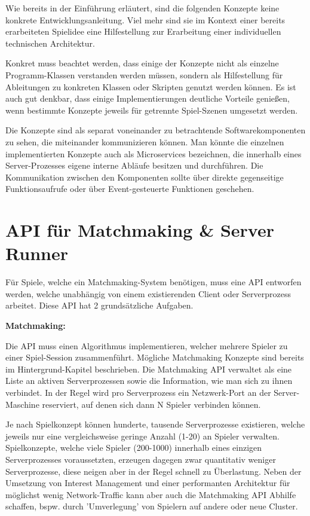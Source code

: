 Wie bereits in der Einführung erläutert, sind die folgenden Konzepte keine konkrete Entwicklungsanleitung. Viel mehr sind sie im Kontext einer bereits erarbeiteten Spielidee eine Hilfestellung zur Erarbeitung einer individuellen technischen Architektur.

Konkret muss beachtet werden, dass einige der Konzepte nicht als einzelne Programm-Klassen verstanden werden müssen, sondern als Hilfestellung für Ableitungen zu konkreten Klassen oder Skripten genutzt werden können. Es ist auch gut denkbar, dass einige Implementierungen deutliche Vorteile genießen, wenn bestimmte Konzepte jeweils für getrennte Spiel-Szenen \cite{Wikipedia.2012} umgesetzt werden.

Die Konzepte sind als separat voneinander zu betrachtende Softwarekomponenten zu sehen, die miteinander kommunizieren können. Man könnte die einzelnen implementierten Konzepte auch als Microservices \cite{Thones.2015} bezeichnen, die innerhalb eines Server-Prozesses eigene interne Abläufe besitzen und durchführen. Die Kommunikation zwischen den Komponenten sollte über direkte gegenseitige Funktionsaufrufe oder über Event-gesteuerte Funktionen \cite{Michelson.2006} geschehen.

\section{API für Matchmaking \& Server Runner}

Für Spiele, welche ein Matchmaking-System benötigen, muss eine API entworfen werden, welche unabhängig von einem existierenden Client oder Serverprozess arbeitet. Diese API hat 2 grundsätzliche Aufgaben. 

\textbf{Matchmaking:}

Die API muss einen Algorithmus implementieren, welcher mehrere Spieler zu einer Spiel-Session zusammenführt. Mögliche Matchmaking Konzepte sind bereits im Hintergrund-Kapitel beschrieben. Die Matchmaking API verwaltet als eine Liste an aktiven Serverprozessen sowie die Information, wie man sich zu ihnen verbindet. In der Regel wird pro Serverprozess ein Netzwerk-Port an der Server-Maschine reserviert, auf denen sich dann N Spieler verbinden können.

Je nach Spielkonzept können hunderte, tausende Serverprozesse existieren, welche jeweils nur eine vergleichsweise geringe Anzahl (1-20) an Spieler verwalten. Spielkonzepte, welche viele Spieler (200-1000) innerhalb eines einzigen Serverprozesses voraussetzten, erzeugen dagegen zwar quantitativ weniger Serverprozesse, diese neigen aber in der Regel schnell zu Überlastung. Neben der Umsetzung von Interest Management und einer performanten Architektur für möglichst wenig Network-Traffic kann aber auch die Matchmaking API Abhilfe schaffen, bspw. durch 'Umverlegung' von Spielern auf andere oder neue Cluster.

